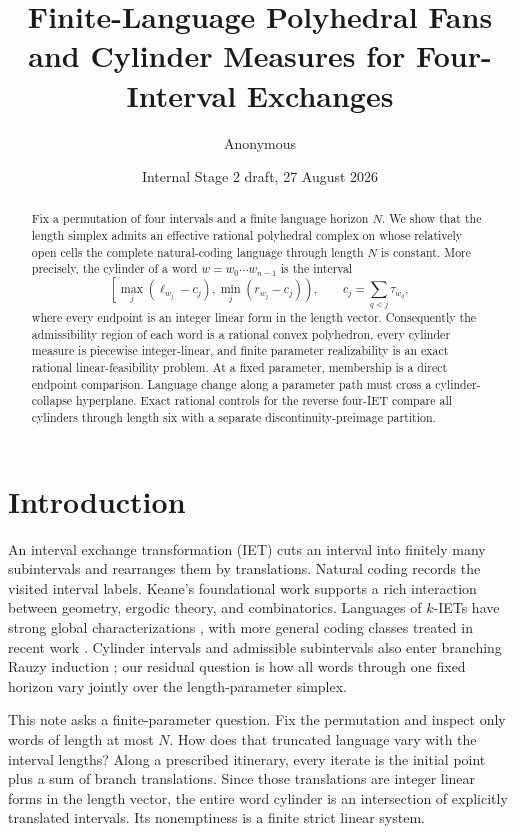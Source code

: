\documentclass[11pt,a4paper]{amsart}
\title[Finite-language fans for four-IETs]{Finite-Language Polyhedral Fans and Cylinder Measures for Four-Interval Exchanges}
\author{Anonymous}
\date{Internal Stage 2 draft, 27 August 2026}
\theoremstyle{definition}
\theoremstyle{remark}
\begin{document}
\begin{abstract}
Fix a permutation of four intervals and a finite language horizon $N$.  We
show that the length simplex admits an effective rational polyhedral complex
on whose relatively open cells the complete natural-coding language through
length $N$ is constant.  More precisely, the cylinder of a word
$w=w_0\cdots w_{n-1}$ is the interval
\[
 \left[
 \max_j(\ell_{w_j}-c_j),
 \min_j(r_{w_j}-c_j)
 \right),
 \qquad c_j=\sum_{q<j}\tau_{w_q},
\]
where every endpoint is an integer linear form in the length vector.
Consequently the admissibility region of each word is a rational convex
polyhedron, every cylinder measure is piecewise integer-linear, and finite
parameter realizability is an exact rational linear-feasibility problem.  At
a fixed parameter, membership is a direct endpoint comparison.  Language change
along a parameter path must cross a cylinder-collapse hyperplane.  Exact
rational controls for the reverse four-IET compare all cylinders through
length six with a separate discontinuity-preimage partition.
\end{abstract}

\maketitle

\section{Introduction}

An interval exchange transformation (IET) cuts an interval into finitely many
subintervals and rearranges them by translations.  Natural coding records the
visited interval labels.  Keane's foundational work \cite{Keane1975} supports
a rich interaction between geometry, ergodic theory, and combinatorics.
Languages of $k$-IETs have strong global
characterizations \cite{FerencziZamboni2008}, with more general coding classes
treated in recent work \cite{FerencziHubertZamboni2026}.  Cylinder intervals
and admissible subintervals also enter branching Rauzy induction
\cite{DolcePerrin2017,DolceHughes2025}; our residual question is how all words
through one fixed horizon vary jointly over the length-parameter simplex.

This note asks a finite-parameter question.  Fix the permutation and inspect
only words of length at most $N$.  How does that truncated language vary with
the interval lengths?  Along a prescribed itinerary, every iterate is the
initial point plus a sum of branch translations.  Since those translations
are integer linear forms in the length vector, the entire word cylinder is an
intersection of explicitly translated intervals.  Its nonemptiness is a
finite strict linear system.
\end{document}
